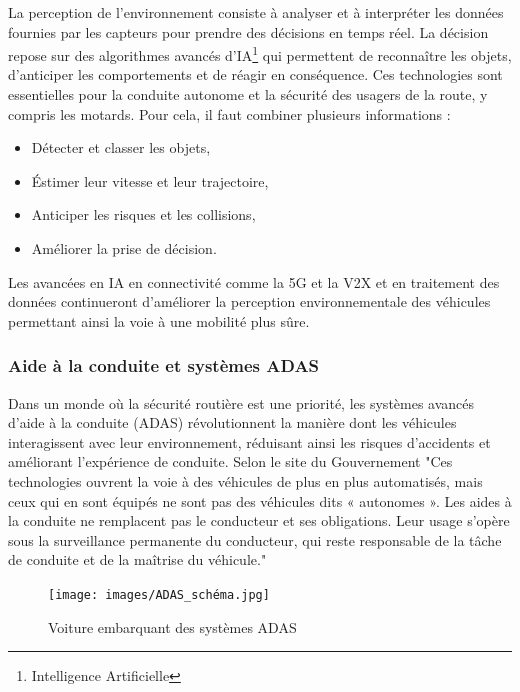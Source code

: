 La perception de l'environnement consiste à analyser et à interpréter les données fournies par les capteurs pour prendre des décisions en temps réel. La décision repose sur des algorithmes avancés d'IA\footnote{Intelligence Artificielle} qui permettent de reconnaître les objets, d'anticiper les comportements et de réagir en conséquence. Ces technologies sont essentielles pour la conduite autonome et la sécurité des usagers de la route, y compris les motards.
Pour cela, il faut combiner plusieurs informations :
\begin{itemize}
    \item Détecter et classer les objets,
    \item Éstimer leur vitesse et leur trajectoire,
    \item Anticiper les risques et les collisions,
    \item Améliorer la prise de décision.
\end{itemize}
Les avancées en IA en connectivité comme la 5G et la V2X et en traitement des données continueront d’améliorer la perception environnementale des véhicules permettant ainsi la voie à une mobilité plus sûre.

\subsubsection{Aide à la conduite et systèmes ADAS}
Dans un monde où la sécurité routière est une priorité, les systèmes avancés d’aide à la conduite (ADAS) révolutionnent la manière dont les véhicules interagissent avec leur environnement, réduisant ainsi les risques d’accidents et améliorant l’expérience de conduite.
Selon le site du Gouvernement \cite{adas_gouv} "Ces technologies ouvrent la voie à des véhicules de plus en plus automatisés, mais ceux qui en sont équipés ne sont pas des véhicules dits « autonomes ». Les aides à la conduite ne remplacent pas le conducteur et ses obligations. Leur usage s’opère sous la surveillance permanente du conducteur, qui reste responsable de la tâche de conduite et de la maîtrise du véhicule."
\begin{figure}[H]
    \centering
    \texttt{[image: images/ADAS\_schéma.jpg]} 
    \caption{Voiture embarquant des systèmes ADAS\cite{continental_adas}}
\end{figure}


